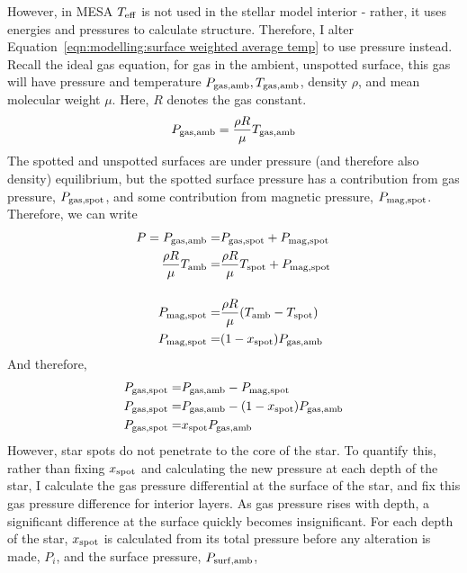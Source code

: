 However, in MESA $T_{\rm eff}$ is not used in the stellar model interior - rather, it uses energies and pressures to calculate structure. Therefore, I alter Equation~\ref{eqn:modelling:surface weighted average temp} to use pressure instead.
Recall the ideal gas equation, for gas in the ambient, unspotted surface, this gas will have pressure and temperature $P_{\rm gas, amb}, T_{\rm gas, amb}$, density $\rho$, and mean molecular weight $\mu$. Here, $R$ denotes the gas constant.
\begin{equation}
    P_{\rm gas, amb} = \frac{\rho R}{\mu} T_{\rm gas, amb}
\end{equation}
The spotted and unspotted surfaces are under pressure (and therefore also density) equilibrium, but the spotted surface pressure has a contribution from gas pressure, $P_{\rm gas, spot}$, and some contribution from magnetic pressure, $P_{\rm mag, spot}$. Therefore, we can write
\begin{align}
    P = P_{\rm gas, amb} =& P_{\rm gas, spot} + P_{\rm mag, spot} \\
    \frac{\rho R}{\mu} T_{\rm amb} =& \frac{\rho R}{\mu} T_{\rm spot} + P_{\rm mag, spot} \\[12pt]
    P_{\rm mag, spot} =& \frac{\rho R}{\mu} (T_{\rm amb} - T_{\rm spot}) \\
    P_{\rm mag, spot} =& (1-x_{\rm spot}) P_{\rm gas, amb} \\
\end{align}
And therefore,
\begin{align}
    P_{\rm gas, spot} =& P_{\rm gas, amb} - P_{\rm mag, spot}\\
    P_{\rm gas, spot} =& P_{\rm gas, amb} - (1-x_{\rm spot}) P_{\rm gas, amb} \\
    P_{\rm gas, spot} =& x_{\rm spot} P_{\rm gas, amb}
\end{align}
However, star spots do not penetrate to the core of the star. To quantify this, rather than fixing $x_{\rm spot}$ and calculating the new pressure at each depth of the star, I calculate the gas pressure differential at the surface of the star, and fix this gas pressure difference for interior layers.
As gas pressure rises with depth, a significant difference at the surface quickly becomes insignificant.
For each depth of the star, $x_{\rm spot}$ is calculated from its total pressure before any alteration is made, $P_i$, and the surface pressure, $P_{\rm surf, amb}$,
